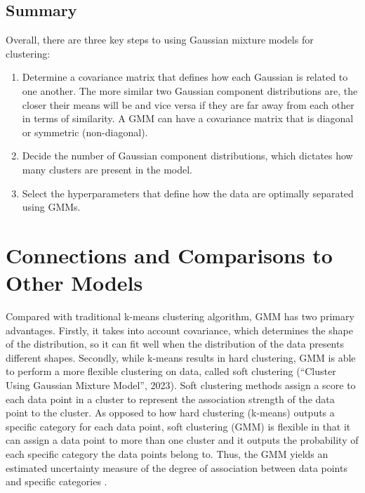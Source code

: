 \documentclass[12pt]{article}
\begin{document}
\hypertarget{summary}{%
\subsection{Summary}\label{summary}}

Overall, there are three key steps to using Gaussian mixture models for
clustering:

\begin{enumerate}
\def\labelenumi{\arabic{enumi}.}
\item
  Determine a covariance matrix that defines how each Gaussian is
  related to one another. The more similar two Gaussian component
  distributions are, the closer their means will be and vice versa if
  they are far away from each other in terms of similarity. A GMM can
  have a covariance matrix that is diagonal or symmetric (non-diagonal).
\item
  Decide the number of Gaussian component distributions, which dictates
  how many clusters are present in the model.
\item
  Select the hyperparameters that define how the data are optimally
  separated using GMMs.
\end{enumerate}

\hypertarget{connections-and-comparisons-to-other-models}{%
\section{Connections and Comparisons to Other
Models}\label{connections-and-comparisons-to-other-models}}

\label{sec:compare}

Compared with traditional k-means clustering algorithm, GMM has two
primary advantages. Firstly, it takes into account covariance, which
determines the shape of the distribution, so it can fit well when the
distribution of the data presents different shapes. Secondly, while
k-means results in hard clustering, GMM is able to perform a more
flexible clustering on data, called soft clustering (``Cluster Using
Gaussian Mixture Model'', 2023). Soft clustering methods assign a score
to each data point in a cluster to represent the association strength of
the data point to the cluster. As opposed to how hard clustering
(k-means) outputs a specific category for each data point, soft
clustering (GMM) is flexible in that it can assign a data point to more
than one cluster and it outputs the probability of each specific
category the data points belong to. Thus, the GMM yields an estimated
uncertainty measure of the degree of association between data points and
specific categories \citep{huang2023gaussian}.
\end{document}
